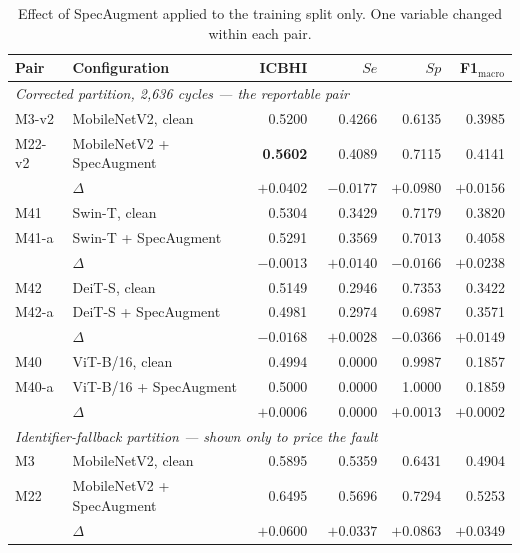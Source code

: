 \documentclass[journal,onecolumn]{IEEEtran}
\newcommand{\best}[1]{\textbf{#1}}
\begin{document}
\begin{table}[!t]
\centering
\caption{Effect of SpecAugment applied to the training split only. One variable
changed within each pair.}
\label{tab:augmentation}
\small
\begin{tabular}{llrrrr}
\toprule
Pair & Configuration & ICBHI & $Se$ & $Sp$ & F1$_{\text{macro}}$ \\
\midrule
\multicolumn{6}{l}{\emph{Corrected partition, 2{,}636 cycles --- the reportable pair}}\\
M3-v2  & MobileNetV2, clean        & 0.5200 & 0.4266 & 0.6135 & 0.3985 \\
M22-v2 & MobileNetV2 + SpecAugment & \best{0.5602} & 0.4089 & 0.7115 & 0.4141 \\
       & $\Delta$                  & \best{$+0.0402$} & $-0.0177$ & $+0.0980$ & $+0.0156$ \\
\midrule
M41    & Swin-T, clean             & 0.5304 & 0.3429 & 0.7179 & 0.3820 \\
M41-a  & Swin-T + SpecAugment      & 0.5291 & 0.3569 & 0.7013 & 0.4058 \\
       & $\Delta$                  & $-0.0013$ & $+0.0140$ & $-0.0166$ & $+0.0238$ \\
\midrule
M42    & DeiT-S, clean             & 0.5149 & 0.2946 & 0.7353 & 0.3422 \\
M42-a  & DeiT-S + SpecAugment      & 0.4981 & 0.2974 & 0.6987 & 0.3571 \\
       & $\Delta$                  & $-0.0168$ & $+0.0028$ & $-0.0366$ & $+0.0149$ \\
\midrule
M40    & ViT-B/16, clean           & 0.4994 & 0.0000 & 0.9987 & 0.1857 \\
M40-a  & ViT-B/16 + SpecAugment    & 0.5000 & 0.0000 & 1.0000 & 0.1859 \\
       & $\Delta$                  & $+0.0006$ & $\phantom{+}0.0000$ & $+0.0013$ & $+0.0002$ \\
\midrule
\multicolumn{6}{l}{\emph{Identifier-fallback partition --- shown only to price the fault}}\\
M3     & MobileNetV2, clean        & 0.5895 & 0.5359 & 0.6431 & 0.4904 \\
M22    & MobileNetV2 + SpecAugment & 0.6495 & 0.5696 & 0.7294 & 0.5253 \\
       & $\Delta$                  & $+0.0600$ & $+0.0337$ & $+0.0863$ & $+0.0349$ \\
\bottomrule
\end{tabular}
\end{table}
\end{document}
